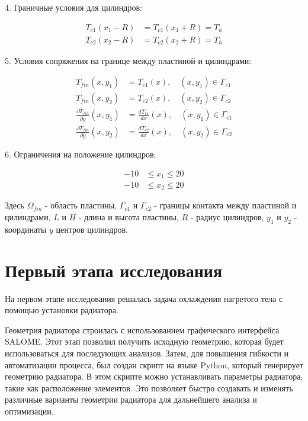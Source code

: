 \documentclass[a4paper,12pt]{extreport}
\numberwithin{equation}{chapter}
\begin{document}
4. Граничные условия для цилиндров:

\begin{align*}
	T_{c1}(x_1 - R) & = T_{c1}(x_1 + R) = T_h \\
	T_{c2}(x_2 - R) & = T_{c2}(x_2 + R) = T_h
\end{align*}

5. Условия сопряжения на границе между пластиной и цилиндрами:

\begin{align*}
	T_{fin}(x, y_1)                             & = T_{c1}(x), \quad (x, y_1) \in \Gamma_{c1}             \\
	T_{fin}(x, y_2)                             & = T_{c2}(x), \quad (x, y_2) \in \Gamma_{c2}             \\
	\frac{\partial T_{fin}}{\partial y}(x, y_1) & = \frac{dT_{c1}}{dx}(x), \quad (x, y_1) \in \Gamma_{c1} \\
	\frac{\partial T_{fin}}{\partial y}(x, y_2) & = \frac{dT_{c2}}{dx}(x), \quad (x, y_2) \in \Gamma_{c2}
\end{align*}

6. Ограничения на положение цилиндров:

\begin{align*}
	-10 & \leq x_1 \leq 20 \\
	-10 & \leq x_2 \leq 20
\end{align*}

Здесь $\Omega_{fin}$ - область пластины, $\Gamma_{c1}$ и $\Gamma_{c2}$ - границы контакта между пластиной и цилиндрами, $L$ и $H$ - длина и высота пластины, $R$ - радиус цилиндров, $y_1$ и $y_2$ - координаты $y$ центров цилиндров.

\section{Первый этапа исследования}

На первом этапе исследования решалась задача охлаждения нагретого тела с помощью установки радиатора.

Геометрия радиатора строилась с использованием графического интерфейса SALOME. Этот этап позволил получить исходную геометрию, которая будет использоваться для последующих анализов.
Затем, для повышения гибкости и автоматизации процесса, был создан скрипт на языке Python, который генерирует геометрию радиатора. 
В этом скрипте можно устанавливать параметры радиатора, такие как расположение элементов.
Это позволяет быстро создавать и изменять различные варианты геометрии радиатора для дальнейшего анализа и оптимизации.
\end{document}
